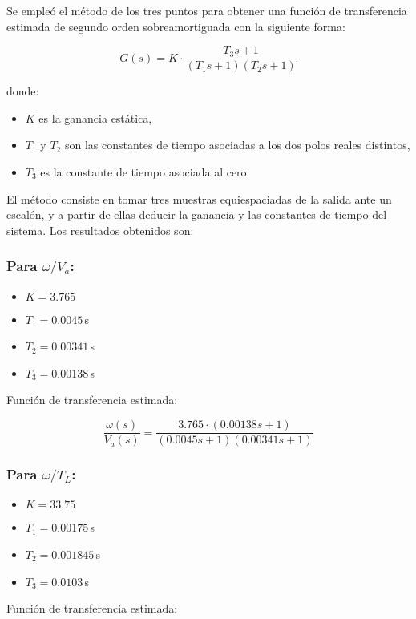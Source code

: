 \documentclass{article}
\begin{document}
Se empleó el método de los tres puntos para obtener una función de transferencia estimada de segundo orden sobreamortiguada con la siguiente forma:

\[
G(s) = K \cdot \frac{T_3 s + 1}{(T_1 s + 1)(T_2 s + 1)}
\]

donde:
\begin{itemize}
    \item $K$ es la ganancia estática,
    \item $T_1$ y $T_2$ son las constantes de tiempo asociadas a los dos polos reales distintos,
    \item $T_3$ es la constante de tiempo asociada al cero.
\end{itemize}

El método consiste en tomar tres muestras equiespaciadas de la salida ante un escalón, y a partir de ellas deducir la ganancia y las constantes de tiempo del sistema. Los resultados obtenidos son:

\subsubsection*{Para $\omega / V_a$:}

\begin{itemize}
    \item $K = 3.765$
    \item $T_1 = 0.0045$\,s
    \item $T_2 = 0.00341$\,s
    \item $T_3 = 0.00138$\,s
\end{itemize}

Función de transferencia estimada:

\[
\frac{\omega(s)}{V_a(s)} = \frac{3.765 \cdot (0.00138s + 1)}{(0.0045s + 1)(0.00341s + 1)}
\]

\subsubsection*{Para $\omega / T_L$:}

\begin{itemize}
    \item $K = 33.75$
    \item $T_1 = 0.00175$\,s
    \item $T_2 = 0.001845$\,s
    \item $T_3 = 0.0103$\,s
\end{itemize}

Función de transferencia estimada:
\end{document}
